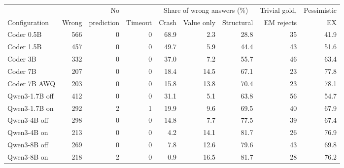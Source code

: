 \begin{tabular}{@{}l rrr rrr rr@{}}
\toprule
 & & No & & \multicolumn{3}{c}{Share of wrong answers (\%)} & Trivial gold, & Pessimistic \\
\cmidrule(lr){5-7}
Configuration & Wrong & prediction & Timeout & Crash & Value only & Structural & EM rejects & EX \\
\midrule
Coder 0.5B & 566 & 0 & 0 & 68.9 & 2.3 & 28.8 & 35 & 41.9 \\
Coder 1.5B & 457 & 0 & 0 & 49.7 & 5.9 & 44.4 & 43 & 51.6 \\
Coder 3B & 332 & 0 & 0 & 37.0 & 7.2 & 55.7 & 46 & 63.4 \\
Coder 7B & 207 & 0 & 0 & 18.4 & 14.5 & 67.1 & 23 & 77.8 \\
Coder 7B AWQ & 203 & 0 & 0 & 15.8 & 13.8 & 70.4 & 23 & 78.1 \\
\midrule
Qwen3-1.7B off & 412 & 0 & 0 & 31.1 & 5.1 & 63.8 & 56 & 54.7 \\
Qwen3-1.7B on & 292 & 2 & 1 & 19.9 & 9.6 & 69.5 & 40 & 67.9 \\
Qwen3-4B off & 298 & 0 & 0 & 14.8 & 7.7 & 77.5 & 39 & 67.4 \\
Qwen3-4B on & 213 & 0 & 0 & 4.2 & 14.1 & 81.7 & 26 & 76.9 \\
Qwen3-8B off & 269 & 0 & 0 & 7.8 & 12.6 & 79.6 & 43 & 69.8 \\
Qwen3-8B on & 218 & 2 & 0 & 0.9 & 16.5 & 81.7 & 28 & 76.2 \\
\bottomrule
\end{tabular}
